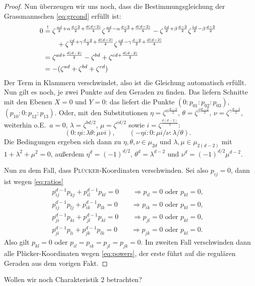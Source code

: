 \begin{proof}
Nun überzeugen wir uns noch, dass die Bestimmungsgleichung der Grassmannschen \eqref{eq:grcond} erfüllt ist:
\begin{align*}
0 &\overrel{=}^! \zeta^{\frac{ad}2+\alpha\frac{d-2}2+\frac{d(d-2)}4} \zeta^{\frac{ad}2-\alpha\frac{d-2}2+\frac{d(d-2)}4} - \zeta^{\frac{bd}2+\beta\frac{d-2}2} \zeta^{\frac{bd}2-\beta\frac{d-2}2} \\
  &\qquad + \zeta^{\frac{cd}2+\gamma\frac{d-2}2+\frac{d(d-2)}4} \zeta^{\frac{cd}2-\gamma\frac{d-2}2+\frac{d(d-2)}4} \\
  &= \zeta^{ad + \frac{d(d-2)}2} - \zeta^{bd} + \zeta^{cd + \frac{d(d-2)}2} \\
  &= -(\zeta^{ad} + \zeta^{bd} + \zeta^{cd})
\end{align*}
Der Term in Klammern verschwindet, also ist die Gleichung automatisch erfüllt. Nun gilt es noch, je zwei Punkte auf den Geraden zu finden. Das liefern Schnitte mit den Ebenen $X=0$ und $Y=0$: das liefert die Punkte $(0:p_{01}:p_{02}:p_{03})$, $(p_{10}:0:p_{12}:p_{13})$. Oder, mit den Substitutionen $\eta = \zeta^{\alpha \frac{d-2}2}$, $\theta = \zeta^{\beta\frac{d-2}2}$, $\nu = \zeta^{\gamma\frac{d-2}2}$, weiterhin o.\;E.~$a=0$, $\lambda = \zeta^{bd/2}$, $\mu = \zeta^{cd/2}$ sowie $i = \zeta^{\frac{d(d-2)}4}$:
\begin{equation}
(0:\eta i:\lambda\theta:\mu\nu i),\qquad
(-\eta i:0:\mu i/\nu:\lambda/\theta).
\end{equation}
Die Bedingungen ergeben sich dann zu $\eta, \theta, \nu \in \mu_{2d}$ und $\lambda, \mu \in \mu_{2(d-2)}$ mit $1+\lambda^2+\mu^2 = 0$, außerdem $\eta^d = (-1)^{d/2}$, $\theta^d = \lambda^{d-2}$ und $\nu^d = (-1)^{d/2}\mu^{d-2}$.

Nun zu dem Fall, dass \textsc{Plücker}-Koordinaten verschwinden. Sei also $p_{ij}=0$, dann ist wegen \eqref{eq:ratios}
\begin{align*}
p_{ij}^{d-1}p_{kj} + p_{il}^{d-1}p_{kl} = 0 \qquad\Rightarrow p_{il} = 0 \text{ oder } p_{kl} = 0, \\
p_{ij}^{d-1}p_{lj} + p_{ik}^{d-1}p_{lk} = 0 \qquad\Rightarrow p_{ik} = 0 \text{ oder } p_{kl} = 0, \\
p_{ji}^{d-1}p_{ki} + p_{jl}^{d-1}p_{kl} = 0 \qquad\Rightarrow p_{jl} = 0 \text{ oder } p_{kl} = 0, \\
p_{ji}^{d-1}p_{li} + p_{jk}^{d-1}p_{lk} = 0 \qquad\Rightarrow p_{jk} = 0 \text{ oder } p_{kl} = 0.
\end{align*}
Also gilt $p_{kl} = 0$ oder $p_{il} = p_{ik} = p_{jl} = p_{jk} = 0$. Im zweiten Fall verschwinden dann alle Plücker-Koordinaten wegen \eqref{eq:powers}, der erste führt auf die regulären Geraden aus dem vorigen Fakt.
\end{proof}
\note Wollen wir noch Charakteristik 2 betrachten?
